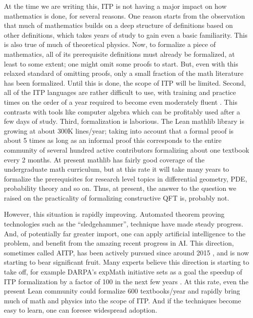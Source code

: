 \documentclass{article}
\newcommand{\1}{\mathbbm{1}}
\theoremstyle{plain}
\theoremstyle{definition}
\numberwithin{equation}{section}
\newcommand{\SH}[2][blue]{\textcolor{#1}{\footnotesize\sf[#2]}}
\begin{document}
At the time we are writing this, ITP is not having a major impact on how mathematics is done, for several reasons.  One reason starts from the observation that much of mathematics builds on a deep structure of definitions based on other definitions, which takes years of study to gain even a basic familiarity.  This is also true of much of theoretical physics.  Now, to formalize a piece of mathematics, all of its prerequisite definitions must already be formalized, at least to some extent; one might omit some proofs to start.  But, even with this relaxed standard of omitting proofs, only a small fraction of the math literature has been formalized.  Until this is done, the scope of ITP will be limited.  Second, all of the ITP languages are rather difficult to use, with training and practice times on the order of a year required to become even moderately fluent \cite{}.    This contrasts with tools like computer algebra which can be profitably used after a few days of study.
Third, formalization is laborious.  The Lean mathlib library \cite{} 
is growing at about 300K lines/year; taking into account that a formal proof is about 5 times as long as an informal proof this corresponds to the entire community of several hundred active contributors formalizing about one textbook every 2 months.  At present mathlib has fairly good coverage of the undergraduate math curriculum, but at this rate it will take many years to formalize the prerequisites for research level topics in differential geometry, PDE, probability theory and so on.  Thus, at present, the answer to the question we raised on the practicality of formalizing constructive QFT is, probably not.

However, this situation is rapidly improving.  Automated theorem proving technologies such as the ``sledgehammer'', \SH{and interactive Lean MCP protocols} technique \cite{} have made steady progress.  And, of potentially far greater import, one can apply artificial intelligence to the problem, and benefit from the amazing recent progress in AI.   This direction, sometimes
called AITP, has been actively pursued since around 2015 \cite{}, and is now starting to bear significant fruit.
Many experts believe this direction is starting to  take off, for example DARPA's expMath initiative sets as a goal the speedup of ITP formalization by a factor of 100 in the next few years \cite{}.  At this rate, even the present Lean community could formalize 600 textbooks/year and rapidly bring much of math and physics into the scope of ITP.
And if the techniques become easy to learn, one can foresee widespread adoption.
\end{document}
